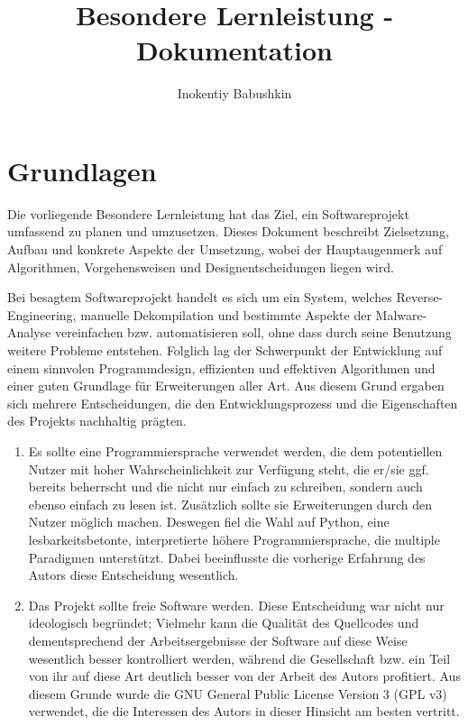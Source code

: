 \documentclass[11pt]{article}
\title{Besondere Lernleistung - Dokumentation}
\author{Inokentiy Babushkin}
\date{}
\begin{document}
\maketitle
\tableofcontents

\section{Grundlagen}
Die vorliegende Besondere Lernleistung hat das Ziel, ein Softwareprojekt
umfassend zu planen und umzusetzen.
Dieses Dokument beschreibt Zielsetzung, Aufbau und konkrete Aspekte der Umsetzung,
wobei der Hauptaugenmerk auf Algorithmen, Vorgehensweisen und Designentscheidungen liegen wird.

Bei besagtem Softwareprojekt handelt es sich um ein System, welches Reverse-Engineering, manuelle
Dekompilation und bestimmte Aspekte der Malware-Analyse vereinfachen bzw. automatisieren soll,
ohne dass durch seine Benutzung weitere Probleme entstehen. Folglich lag der Schwerpunkt der Entwicklung
auf einem sinnvolen Programmdesign, effizienten und effektiven Algorithmen und einer guten Grundlage
für Erweiterungen aller Art. Aus diesem Grund ergaben sich mehrere Entscheidungen, die den Entwicklungsprozess
und die Eigenschaften des Projekts nachhaltig prägten.
\begin{enumerate}
	\item{Es sollte eine Programmiersprache verwendet werden, die dem potentiellen Nutzer mit hoher
		Wahrscheinlichkeit zur Verfügung steht, die er/sie ggf. bereits beherrscht und die nicht nur
		einfach zu schreiben, sondern auch ebenso einfach zu lesen ist. Zusätzlich sollte sie Erweiterungen
		durch den Nutzer möglich machen. Deswegen fiel die Wahl auf Python, eine lesbarkeitsbetonte,
		interpretierte höhere Programmiersprache, die multiple Paradigmen unterstützt.
		Dabei beeinflusste die vorherige Erfahrung des Autors diese Entscheidung wesentlich.
	}
	\item{Das Projekt sollte freie Software werden. Diese Entscheidung war nicht nur ideologisch begründet;
		Vielmehr kann die Qualität des Quellcodes und dementsprechend der Arbeitsergebnisse der Software
        auf diese Weise wesentlich besser kontrolliert werden, während die Gesellschaft bzw. ein Teil von
        ihr auf diese Art deutlich besser von der Arbeit des Autors profitiert. Aus diesem Grunde wurde die
        GNU General Public License Version 3 (GPL v3) verwendet, die die Interessen des Autors in dieser Hinsicht
        am besten vertritt.
	}
\end{enumerate}
\end{document}
